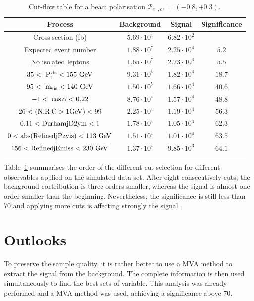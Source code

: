  \begin{table}
    \begin{tabular}{c c c c}
      \hline
      Process                                     & Background          & Signal              & Significance  \tabularnewline
      \hline
      \hline
      Cross-section (fb)                          & $5.69 \cdot 10^{4}$ & $6.82 \cdot 10^{2}$ &               \tabularnewline
      \hline
      Expected event number                       & $1.88 \cdot 10^{7}$ & $2.25 \cdot 10^{4}$ & $5.2$         \tabularnewline
      No isolated leptons                         & $1.65 \cdot 10^{7}$ & $2.23 \cdot 10^{4}$ & $5.5$         \tabularnewline
      {$35 <~\rm{{P}_{t}^{vis}} < 155~\rm{GeV} $} & $9.31 \cdot 10^{5}$ & $1.82 \cdot 10^{4}$ & $18.7$        \tabularnewline
      {$95 <~\rm{m_{vis}}< 140~\rm{GeV}$}         & $1.50 \cdot 10^{5}$ & $1.66 \cdot 10^{4}$ & $40.6$        \tabularnewline
      {$-1 <~\rm{\cos{\alpha}}< 0.22$}            & $8.76 \cdot 10^{4}$ & $1.57 \cdot 10^{4}$ & $48.8$        \tabularnewline
      $26 < (\rm{N.R.C > 1GeV}) < 99$             & $2.25 \cdot 10^{4}$ & $1.19 \cdot 10^{4}$ & $56.3$        \tabularnewline
      $0.11 < \rm{DurhamjD2ym} < 1$               & $1.78 \cdot 10^{4}$ & $1.05 \cdot 10^{4}$ & $62.3$        \tabularnewline
      $0 < \rm{abs(RefinedjPzvis)} < 113~\rm{GeV}$& $1.51 \cdot 10^{4}$ & $1.01 \cdot 10^{4}$ & $63.5$        \tabularnewline
      $156 < \rm{RefinedjEmiss} < 230~\rm{GeV}$   & $1.37 \cdot 10^{4}$ & $9.85 \cdot 10^{3}$ & $64.1$        \tabularnewline      
      \hline %
    \end{tabular}
    \caption{Cut-flow table for a beam polarisation $\mathcal{P}_{e^{-},e^{+}} = (-0.8, +0.3)$.}
    \label{tab:cutFlow}
  \end{table}

  Table~\ref{tab:cutFlow} summarises the order of the different cut selection for different observables applied on the simulated data set.
  After eight consecutively cuts, the background contribution is three orders smaller, whereas the signal is almost one order smaller than the beginning.
  Nevertheless, the significance is still less than 70 and applying more cuts is affecting strongly the signal.

  \section{Outlooks}

  To preserve the sample quality, it is rather better to use a \gls{MVA} method to extract the signal from the background.
  The complete information is then used simultaneously to find the best sets of variable.
  This analysis was already performed and a \gls{MVA} method was used, achieving a significance above $70$.

